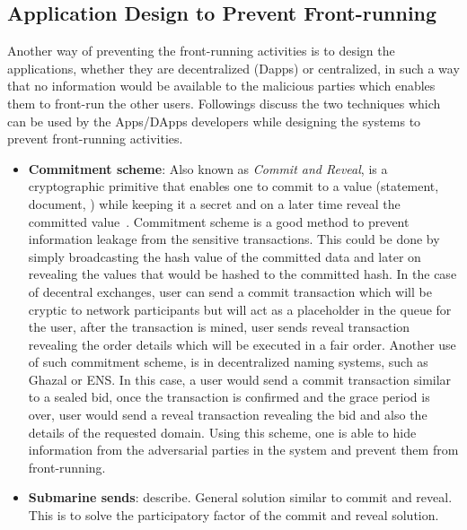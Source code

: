\subsection{Application Design to Prevent Front-running}

Another way of preventing the front-running activities is to design the applications, whether they are decentralized (Dapps) or centralized, in such a way that no information would be available to the malicious parties which enables them to front-run the other users.
Followings discuss the two techniques which can be used by the Apps/DApps developers while designing the systems to prevent front-running activities.

\begin{itemize}
\item{\textbf{Commitment scheme}: Also known as \textit{Commit and Reveal}, is a cryptographic primitive that enables one to commit to a value (\eg statement, document, \etc}) while keeping it a secret and on a later time reveal the committed value~\cite{brassard1988minimum}. Commitment scheme is a good method to prevent information leakage from the sensitive transactions. This could be done by simply broadcasting the hash value of the committed data and later on revealing the values that would be hashed to the committed hash. 
In the case of decentral exchanges, user can send a commit transaction which will be cryptic to network participants but will act as a placeholder in the queue for the user, after the transaction is mined, user sends reveal transaction revealing the order details which will be executed in a fair order. Another use of such commitment scheme, is in decentralized naming systems, such as Ghazal or ENS. In this case, a user would send a commit transaction similar to a sealed bid, once the transaction is confirmed and the grace period is over, user would send a reveal transaction revealing the bid and also the details of the requested domain. Using this scheme, one is able to hide information from the adversarial parties in the system and prevent them from front-running.





\item{\textbf{Submarine sends}: describe. General solution similar to commit and reveal. This is to solve the participatory factor of the commit and reveal solution.}


\end{itemize}
